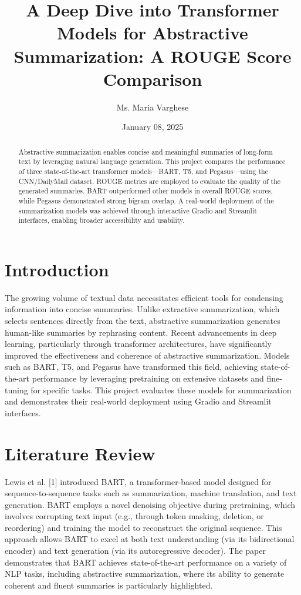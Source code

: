 \documentclass[a4paper,12pt]{article}
\title{\textbf{A Deep Dive into Transformer Models for Abstractive Summarization: A ROUGE Score Comparison}}
\author{Ms. Maria Varghese\vspace{-0.3cm}}
\affil{APJ Abdul Kalam Technological University, Kerala, India\vspace{-0.3cm}}  %
\affil{mariathelappilly@gmail.com\vspace{-0.3cm}}  %
\date{January 08, 2025}
\begin{document}
\maketitle

\begin{abstract}
Abstractive summarization enables concise and meaningful summaries of long-form text by leveraging natural language generation. This project compares the performance of three state-of-the-art transformer models—BART, T5, and Pegasus—using the CNN/DailyMail dataset. ROUGE metrics are employed to evaluate the quality of the generated summaries. BART outperformed other models in overall ROUGE scores, while Pegasus demonstrated strong bigram overlap. A real-world deployment of the summarization models was achieved through interactive Gradio and Streamlit interfaces, enabling broader accessibility and usability.
\end{abstract}

\section{Introduction}
The growing volume of textual data necessitates efficient tools for condensing information into concise summaries. Unlike extractive summarization, which selects sentences directly from the text, abstractive summarization generates human-like summaries by rephrasing content. Recent advancements in deep learning, particularly through transformer architectures, have significantly improved the effectiveness and coherence of abstractive summarization. Models such as BART, T5, and Pegasus have transformed this field, achieving state-of-the-art performance by leveraging pretraining on extensive datasets and fine-tuning for specific tasks. This project evaluates these models for summarization and demonstrates their real-world deployment using Gradio and Streamlit interfaces.

\section{Literature Review}

Lewis et al. [1] introduced BART, a transformer-based model designed for sequence-to-sequence tasks such as summarization, machine translation, and text generation. BART employs a novel denoising objective during pretraining, which involves corrupting text input (e.g., through token masking, deletion, or reordering) and training the model to reconstruct the original sequence. This approach allows BART to excel at both text understanding (via its bidirectional encoder) and text generation (via its autoregressive decoder). The paper demonstrates that BART achieves state-of-the-art performance on a variety of NLP tasks, including abstractive summarization, where its ability to generate coherent and fluent summaries is particularly highlighted.
\end{document}
